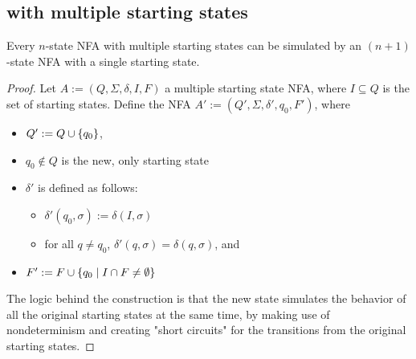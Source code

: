 \subsection{\NFAs with multiple starting states}
\begin{thrm}
	Every $n$-state NFA with multiple starting states can be simulated by an $(n+1)$-state NFA with a single starting state.
\end{thrm}
\begin{proof}
	Let $A:=(Q,\Sigma,\delta,I,F)$ a multiple starting state NFA, where $I\subseteq Q$ is the set of starting states.
	Define the NFA $A':=(Q',\Sigma,\delta',q_0,F')$, where
	\begin{itemize}
		\item $Q':=Q\cup\{q_0\}$,
		\item $q_0\notin Q$ is the new, only starting state
		\item $\delta'$ is defined as follows:
		      \begin{itemize}
			      \item $\delta'(q_0,\sigma):=\delta(I,\sigma)$
			      \item for all $q\ne q_0$, $\delta'(q,\sigma)=\delta(q,\sigma)$, and
		      \end{itemize}
		\item $F':=F\cup\{q_0\mid I\cap F\ne\emptyset\}$
	\end{itemize}
	The logic behind the construction is that the new state simulates the behavior of all the original starting states at the same time, by making use of nondeterminism and creating "short circuits" for the transitions from the original starting states.


\end{proof}
